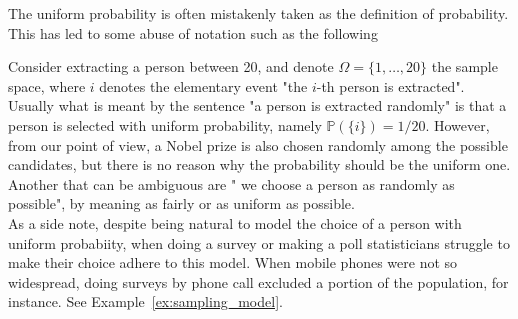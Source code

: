 	The uniform probability is often mistakenly taken as the definition of probability. This has led to some abuse of notation such as the following 
	\begin{example}
		\label{ex:person}
		Consider extracting a person between 20, and denote $\Omega =\{1,\ldots, 20\}$ the sample space, where $i$  denotes the elementary event "the $i$-th person is extracted".  Usually  what is meant by the sentence "a person is extracted randomly" is that a person is selected with uniform probability, namely $\mathbb P(\{i\}) = 1/20$. However, from our point of view, a Nobel prize is also chosen randomly among the possible candidates, but there is no reason why the probability should be the uniform one. Another that can be ambiguous are " we choose a person as randomly as possible", by meaning as fairly or as uniform as possible. \\
		 As a side note, despite being natural to model the choice of a person with uniform probabiity, when doing a survey or making a poll statisticians struggle to make their choice adhere to this model. When mobile phones were not so widespread, doing surveys by phone call excluded a portion of the population, for instance. See Example~\ref{ex:sampling_model}.  
	\end{example}

